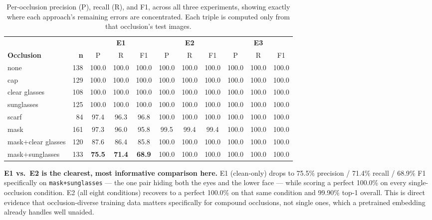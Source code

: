 \documentclass[11pt]{article}
\begin{document}
\begin{table}[h]
\centering
\footnotesize
\caption{Per-occlusion precision (P), recall (R), and F1, across all three experiments, showing exactly where each approach's remaining errors are concentrated. Each triple is computed only from that occlusion's test images.}
\begin{tabular}{lr ccc ccc ccc}
\toprule
& & \multicolumn{3}{c}{\textbf{E1}} & \multicolumn{3}{c}{\textbf{E2}} & \multicolumn{3}{c}{\textbf{E3}} \\
\cmidrule(lr){3-5}\cmidrule(lr){6-8}\cmidrule(lr){9-11}
\textbf{Occlusion} & \textbf{n} & P & R & F1 & P & R & F1 & P & R & F1 \\
\midrule
none               & 138 & 100.0 & 100.0 & 100.0 & 100.0 & 100.0 & 100.0 & 100.0 & 100.0 & 100.0 \\
cap                & 129 & 100.0 & 100.0 & 100.0 & 100.0 & 100.0 & 100.0 & 100.0 & 100.0 & 100.0 \\
clear glasses      & 108 & 100.0 & 100.0 & 100.0 & 100.0 & 100.0 & 100.0 & 100.0 & 100.0 & 100.0 \\
sunglasses         & 125 & 100.0 & 100.0 & 100.0 & 100.0 & 100.0 & 100.0 & 100.0 & 100.0 & 100.0 \\
scarf              &  84 &  97.4 &  96.3 &  96.8 & 100.0 & 100.0 & 100.0 & 100.0 & 100.0 & 100.0 \\
mask               & 161 &  97.3 &  96.0 &  95.8 &  99.5 &  99.4 &  99.4 & 100.0 & 100.0 & 100.0 \\
mask+clear glasses & 120 &  87.6 &  86.4 &  85.8 & 100.0 & 100.0 & 100.0 & 100.0 & 100.0 & 100.0 \\
mask+sunglasses    & 133 &  \textbf{75.5} &  \textbf{71.4} &  \textbf{68.9} & 100.0 & 100.0 & 100.0 & 100.0 & 100.0 & 100.0 \\
\bottomrule
\end{tabular}
\end{table}

\textbf{E1 vs.\ E2 is the clearest, most informative comparison here.} E1 (clean-only) drops to 75.5\% precision / 71.4\% recall / 68.9\% F1 specifically on \texttt{mask+sunglasses} — the one pair hiding both the eyes and the lower face — while scoring a perfect 100.0\% on every single-occlusion condition. E2 (all eight conditions) recovers to a perfect 100.0\% on that same condition and 99.90\% top-1 overall. This is direct evidence that occlusion-diverse training data matters specifically for compound occlusions, not single ones, which a pretrained embedding already handles well unaided.
\end{document}
